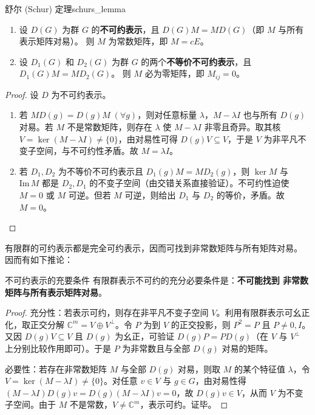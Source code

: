 \begin{theorem}{舒尔 (Schur) 定理}{schurs_lemma}
    \begin{enumerate}
        \item 设 $D(G)$ 为群 $G$ 的\textbf{不可约表示}，且 $D(G)M = MD(G)$（即 $M$ 与所有表示矩阵对易）。
        则 $M$ 为常数矩阵，即 $M = cE$。
        
        \item 设 $D_1(G)$ 和 $D_2(G)$ 为群 $G$ 的两个\textbf{不等价不可约表示}，且 $D_1(G)M = MD_2(G)$。
        则 $M$ 必为零矩阵，即 $M_{ij} = 0$。
        
    \end{enumerate}
\end{theorem}

\begin{proof}
    设 $D$ 为不可约表示。
    \begin{enumerate}
        \item 若 $MD(g)=D(g)M\;(\forall g)$，则对任意标量 $\lambda$，$M-\lambda I$ 也与所有 $D(g)$ 对易。若 $M$ 不是常数矩阵，则存在 $\lambda$ 使 $M-\lambda I$ 非零且奇异。取其核 $V=\ker(M-\lambda I)\ne\{0\}$，由对易性可得 $D(g)V\subseteq V$，于是 $V$ 为非平凡不变子空间，与不可约性矛盾。故 $M=\lambda I$。
        \item 若 $D_1, D_2$ 为不等价不可约表示且 $D_1(g)M = M D_2(g)$，则 $\ker M$ 与 $\mathrm{Im}\,M$ 都是 $D_2, D_1$ 的不变子空间（由交错关系直接验证）。不可约性迫使 $M=0$ 或 $M$ 可逆。但若 $M$ 可逆，则给出 $D_1$ 与 $D_2$ 的等价，矛盾。故 $M=0$。
    \end{enumerate}
\end{proof}

\begin{note}
    有限群的可约表示都是完全可约表示，因而可找到非常数矩阵与所有矩阵对易。
    因而有如下推论：
\end{note}

\begin{corollary}{不可约表示的充要条件}
    有限群表示不可约的充分必要条件是：\textbf{不可能找到 非常数 矩阵与所有表示矩阵对易}。
\end{corollary}

\begin{proof}
    充分性：若表示可约，则存在非平凡不变子空间 $V$。利用有限群表示可幺正化，取正交分解 $\mathbb{C}^m=V\oplus V^\perp$。令 $P$ 为到 $V$ 的正交投影，则 $P^2=P$ 且 $P\ne 0,I$。又因 $D(g)V\subseteq V$ 且 $D(g)$ 为幺正，可验证 $D(g)P=PD(g)$（在 $V$ 与 $V^\perp$ 上分别比较作用即可）。于是 $P$ 为非常数且与全部 $D(g)$ 对易的矩阵。

    必要性：若存在非常数矩阵 $M$ 与全部 $D(g)$ 对易，则取 $M$ 的某个特征值 $\lambda$，令 $V=\ker(M-\lambda I)\ne\{0\}$。对任意 $v\in V$ 与 $g\in G$，由对易性得 $(M-\lambda I)D(g)v=D(g)(M-\lambda I)v=0$，故 $D(g)v\in V$，从而 $V$ 为不变子空间。由于 $M$ 不是常数，$V\ne\mathbb{C}^m$，表示可约。证毕。
\end{proof}

